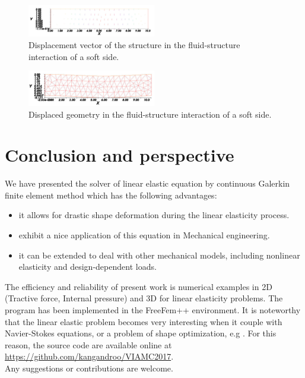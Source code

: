 \documentclass[notitlepage,a4paper,fleqn,9pt]{icmfarticle}
\begin{document}
\begin{multicols}{2}
\begin{figure}[H]
  \begin{center}
    \includegraphics[width=0.5\textwidth]{4-6-2.pdf}
  \end{center}
  \caption{Displacement vector of the structure in the fluid-structure interaction of a soft side.}
  \label{fig-dg-neighbor}
\end{figure}

\begin{figure}[H]
  \begin{center}
    \includegraphics[width=0.5\textwidth]{4-6-3.pdf}
  \end{center}
  \caption{Displaced geometry in the fluid-structure interaction of a soft side.}
  \label{fig-dg-neighbor}
\end{figure}

\section{Conclusion and perspective}
\label{sec:conclusion}
We have presented the solver of linear elastic equation by continuous Galerkin finite element method which has the following advantages:
\begin{itemize}
  \item it allows for drastic shape deformation during the linear elasticity process.
  \item exhibit a nice application of this equation in Mechanical engineering.
  \item it can be extended to deal with other mechanical models, including nonlinear elasticity and design-dependent loads.
\end{itemize}
The efficiency and reliability of present work is numerical examples in 2D (Tractive force, Internal pressure) and 3D for linear elasticity problems. The program has been implemented in the FreeFem++ environment. It is noteworthy that the linear elastic problem becomes very interesting when it couple with Navier-Stokes equations, or a problem of shape optimization, e.g \cite{ABF97,AJT04}. For this reason, the source code are available online at \url{https://github.com/kangandroo/VIAMC2017}. 
\\
Any suggestions or contributions are welcome.


\end{multicols}
\end{document}
